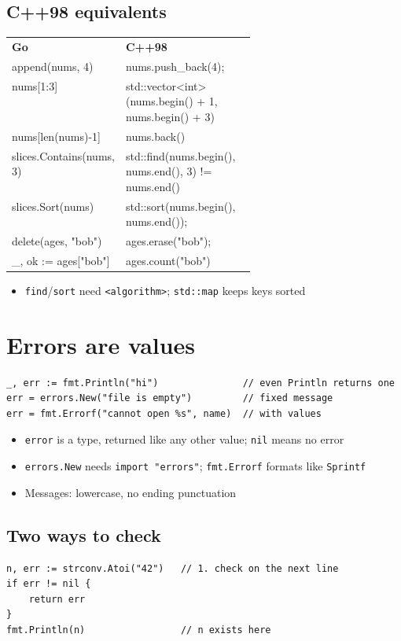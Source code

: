 \documentclass[9pt]{extarticle}
\newcommand{\Go}{\textbf{\textcolor{goblue}{Go}}}
\newcommand{\kw}[1]{\textcolor{accent}{\texttt{#1}}}
\begin{document}
\begin{multicols*}{2}
\subsection{C++98 equivalents}
{\footnotesize\ttfamily
\begin{tabularx}{\linewidth}{@{}>{\raggedright\arraybackslash}p{0.36\linewidth}>{\raggedright\arraybackslash}X@{}}
\rowcolor{tablehead}\textsf{\textbf{\Go}} & \textsf{\textbf{C++98}}\\
append(nums, 4)          & nums.push\_back(4);\\
nums[1:3]                & std::vector<int>(nums.begin() + 1, nums.begin() + 3)\\
nums[len(nums)-1]        & nums.back()\\
slices.Contains(nums, 3) & std::find(nums.begin(), nums.end(), 3) != nums.end()\\
slices.Sort(nums)        & std::sort(nums.begin(), nums.end());\\
delete(ages, "bob")      & ages.erase("bob");\\
\_, ok := ages["bob"]    & ages.count("bob")\\
\end{tabularx}}
\begin{itemize}
  \item \kw{find}/\kw{sort} need \kw{<algorithm>}; \kw{std::map} keeps keys sorted
\end{itemize}

\section{Errors are values}
\begin{lstlisting}
_, err := fmt.Println("hi")               // even Println returns one
err = errors.New("file is empty")         // fixed message
err = fmt.Errorf("cannot open %s", name)  // with values
\end{lstlisting}
\begin{itemize}
  \item \kw{error} is a type, returned like any other value; \kw{nil} means no error
  \item \kw{errors.New} needs \kw{import "errors"}; \kw{fmt.Errorf} formats like \kw{Sprintf}
  \item Messages: lowercase, no ending punctuation
\end{itemize}
\subsection{Two ways to check}
\begin{lstlisting}
n, err := strconv.Atoi("42")   // 1. check on the next line
if err != nil {
    return err
}
fmt.Println(n)                 // n exists here


\end{lstlisting}
\end{multicols*}
\end{document}
